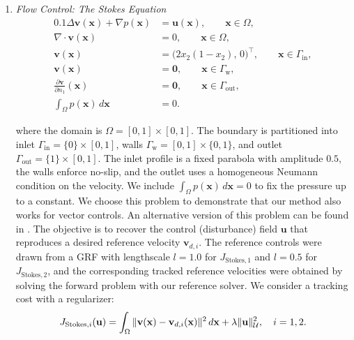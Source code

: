 \documentclass[final,1p,times]{elsarticle}
\theoremstyle{plain} %
\theoremstyle{definition} %
\theoremstyle{remark} %
\begin{document}
\begin{enumerate}
\item \textit{Flow Control: The Stokes Equation}
\begin{equation}\label{eq:stokes}
\begin{aligned}
0.1\Delta \mathbf{v}(\mathbf{x}) + \nabla p(\mathbf{x})
&= \mathbf{u}(\mathbf{x}), 
\qquad \mathbf{x}\in\Omega,\\
\nabla \cdot \mathbf{v}(\mathbf{x})
&= 0,
\qquad \mathbf{x}\in\Omega,\\
\mathbf{v}(\mathbf{x})
&= \bigl(2x_2(1-x_2),\,0\bigr)^\top,
\qquad \mathbf{x}\in\Gamma_{\mathrm{in}},\\
\mathbf{v}(\mathbf{x})
&= \mathbf{0},
\qquad \mathbf{x}\in\Gamma_{\mathrm{w}},\\
\frac{\partial \mathbf{v}}{\partial n_1}(\mathbf{x})
&= \mathbf{0},
\qquad \mathbf{x}\in\Gamma_{\mathrm{out}},\\
\int_{\Omega} p(\mathbf{x})\,d\mathbf{x}
&= 0. 
\end{aligned}
\end{equation}

    where the domain is $\Omega=[0,1]\times[0,1]$. The boundary is partitioned into inlet $\Gamma_{\mathrm{in}}=\{0\}\times[0,1]$, walls $\Gamma_{\mathrm{w}}=[0,1]\times\{0,1\}$, and outlet $\Gamma_{\mathrm{out}}=\{1\}\times[0,1]$. The inlet profile is a fixed parabola with amplitude $0.5$, the walls enforce no-slip, and the outlet uses a homogeneous Neumann condition on the velocity. We include $\int_{\Omega}p(\mathbf{x})\,d\mathbf{x}=0$ to fix the pressure up to a constant. We choose this problem to demonstrate that our method also works for vector controls. An alternative version of this problem can be found in \cite{Demo2023}. The objective is to recover the control (disturbance) field $\mathbf{u}$ that reproduces a desired reference velocity $\mathbf{v}_{d,i}$. The reference controls were drawn from a GRF with lengthscale $l=1.0$ for $J_{\mathrm{Stokes},1}$ and $l=0.5$ for $J_{\mathrm{Stokes},2}$, and the corresponding tracked reference velocities were obtained by solving the forward problem with our reference solver. We consider a tracking cost with a regularizer:
    \begin{equation}\label{cost:stokes}
    J_{\mathrm{Stokes},i}(\mathbf{u})
      = \int_{\Omega} \|\mathbf{v}(\mathbf{x}) - \mathbf{v}_{d,i}(\mathbf{x})\|^2\,d\mathbf{x} + \lambda\|\mathbf{u}\|^2_{\mathcal{U}}, \quad i=1,2.\\
    \end{equation}

\end{enumerate}
\end{document}
